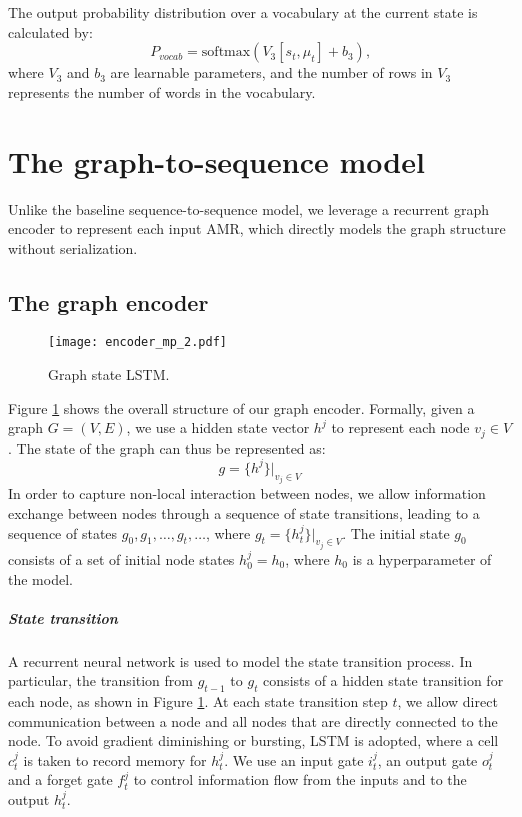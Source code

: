 \documentclass[11pt,a4paper]{article}
\begin{document}
The output probability distribution over a vocabulary at the current state is calculated by:
\begin{equation}
P_{vocab} = \textrm{softmax}(V_3[s_t,\mu_t]+b_3)\textrm{,}
\label{eq:pvocab}
\end{equation}
where $V_3$ and $b_3$ are learnable parameters, and the number of rows in $V_3$ represents the number of words in the vocabulary.


\section{The graph-to-sequence model}

Unlike the baseline sequence-to-sequence model,
we leverage a recurrent graph encoder to represent each input AMR, which directly models the graph structure without serialization. 

\subsection{The graph encoder}



\begin{figure}
\centering
\texttt{[image: encoder\_mp\_2.pdf]}
\caption{Graph state LSTM.}
\label{fig:encoder}
\end{figure}


Figure \ref{fig:encoder} shows the overall structure of our graph encoder. 
Formally, given a graph $G=(V, E)$, we use a hidden state vector $h^j$ to represent each node $v_j \in V$. 
The state of the graph can thus be represented as:
\[
g = \{h^j\}|_{v_j \in V}
\]
In order to capture non-local interaction between nodes, we allow information exchange between nodes through a sequence of state transitions, leading to a sequence of states $g_0, g_1, \dots, g_t, \dots$, where $g_t = \{h_t^j\}|_{v_j \in V}$.
The initial state $g_0$ consists of a set of initial node states $h_0^j=h_0$, where $h_0$ is a hyperparameter of the model. 


\subparagraph{State transition}
A recurrent neural network is used to model the state transition process. 
In particular, the transition from $g_{t-1}$ to $g_t$ consists of a
hidden state transition for each node, as shown in Figure \ref{fig:encoder}. 
At each state transition step $t$, we allow direct communication between a node and all nodes that are directly connected to the node. 
To avoid gradient diminishing or bursting, LSTM \cite{hochreiter1997long} is adopted, where a cell $c_t^j$ is taken to record memory for $h_t^j$. 
We use an input gate $i_t^j$, an output gate $o_t^j$ and a forget gate $f_t^j$ to control information flow from the inputs and to the output $h_t^j$.
\end{document}
